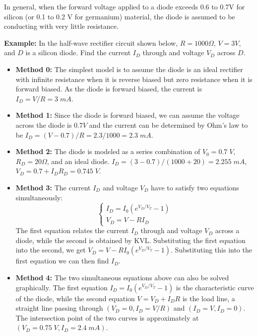 
In general, when the forward voltage applied to a diode exceeds 0.6 to 
0.7V for silicon (or 0.1 to 0.2 V for germanium) material, the diode is 
assumed to be conducting with very little resistance.

{\bf Example: } In the half-wave rectifier circuit shown below, 
$R=1000\Omega$, $V=3V$, and $D$ is a silicon diode. Find the current
$I_D$ through and voltage $V_D$ across $D$.


\begin{itemize}

\item {\bf Method 0:} The simplest model is to assume the diode is an ideal
  rectifier with infinite resistance when it is reverse biased but zero
  resistance when it is forward biased. As the diode is forward biased,
  the current is $I_D=V/R=3\;mA$.

\item {\bf Method 1: } Since the diode is forward biased, we can assume 
  the voltage across the diode is $0.7V$ and the current can be determined 
  by Ohm's law to be $I_D=(V-0.7)/R=2.3/1000=2.3\;mA$.

\item {\bf Method 2: } The diode is modeled as a series combination of
  $V_0=0.7\;V$, $R_D=20\Omega$, and an ideal diode. $I_D=(3-0.7)/(1000+20)=2.255\;mA$,
  $V_D=0.7+I_DR_D=0.745\;V$.

\item {\bf Method 3: } The current $I_D$ and voltage $V_D$ have to satisfy 
  two equations simultaneously:
  \[
  \left\{ \begin{array}{l} I_D=I_0(e^{V_D/V_T}-1) \\
    V_D=V-RI_D \end{array} \right. 
  \]
  The first equation relates the current $I_D$ through and voltage $V_D$ 
  across a diode, while the second is obtained by KVL. Substituting the first
  equation into the second, we get $V_D=V-RI_0(e^{V_D/V_T}-1)$. Substituting
  this into the first equation we can then find $I_D$.

\item {\bf Method 4: } The two simultaneous equations above can also be
  solved graphically. The first equation $I_D=I_0(e^{V_D/V_T}-1)$ is the
  characteristic curve of the diode, while the second equation $V=V_D+I_DR$
  is the load line, a straight line passing through $(V_D=0, I_D=V/R)$ and 
  $(I_D=V, I_D=0)$. The intersection point of the two curves is approximately
  at $(V_D=0.75\;V, I_D=2.4\;mA)$.

\end{itemize}


